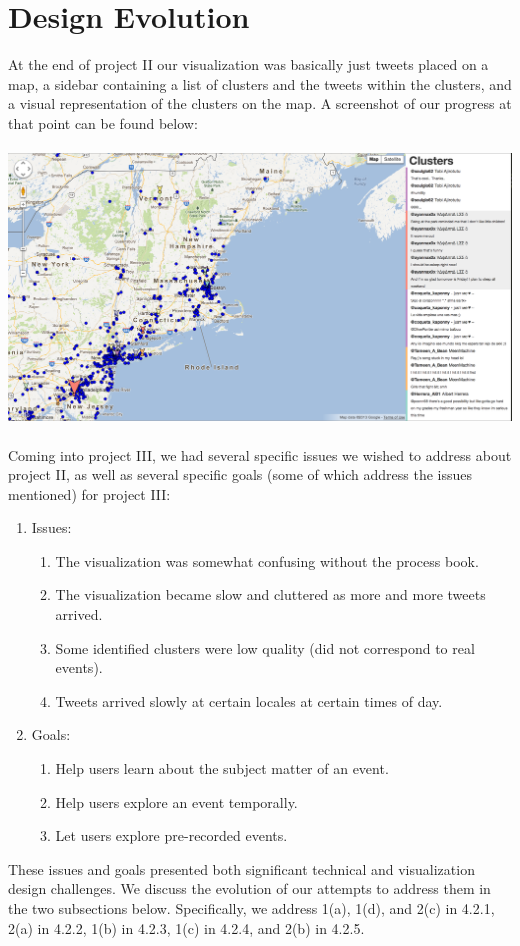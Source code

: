 \documentclass[pdftex,12pt,a4paper]{article}
\begin{document}
\section{Design Evolution}
At the end of project II our visualization was basically just tweets placed on a map, a sidebar containing a list of clusters and the tweets within the clusters, and a visual representation of the clusters on the map. A screenshot of our progress at that point can be found below: \\ \\
\includegraphics[width=5.5in]{project2.png} \\ \\
Coming into project III, we had several specific issues we wished to address about project II, as well as several specific goals (some of which address the issues mentioned) for project III:
\begin{enumerate}
\item Issues:
\begin{enumerate}
\item The visualization was somewhat confusing without the process book.
\item The visualization became slow and cluttered as more and more tweets arrived.
\item Some identified clusters were low quality (did not correspond to real events).
\item Tweets arrived slowly at certain locales at certain times of day.
\end{enumerate}
\item Goals:
\begin{enumerate}
\item Help users learn about the subject matter of an event.
\item Help users explore an event temporally.
\item Let users explore pre-recorded events. 
\end{enumerate}
\end{enumerate}
These issues and goals presented both significant technical and visualization design challenges. We discuss the evolution of our attempts to address them in the two subsections below. Specifically, we  address 1(a), 1(d), and 2(c) in 4.2.1, 2(a) in 4.2.2, 1(b) in 4.2.3, 1(c) in 4.2.4, and 2(b) in 4.2.5.
\end{document}
